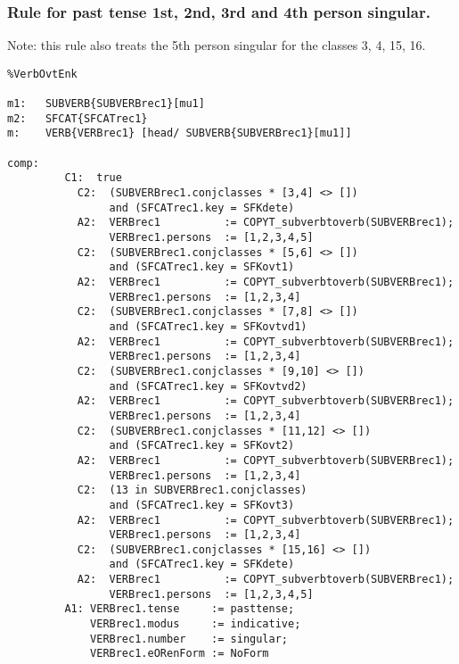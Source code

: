 \subsubsection{Rule for past tense 1st, 2nd, 3rd and 4th person singular.}

Note: this rule also treats the 5th
         person singular for the classes 3, 4, 15, 16.

\begin{verbatim}
%VerbOvtEnk

m1:   SUBVERB{SUBVERBrec1}[mu1]
m2:   SFCAT{SFCATrec1}
m:    VERB{VERBrec1} [head/ SUBVERB{SUBVERBrec1}[mu1]]

comp:
         C1:  true
           C2:  (SUBVERBrec1.conjclasses * [3,4] <> []) 
                and (SFCATrec1.key = SFKdete)
           A2:  VERBrec1          := COPYT_subverbtoverb(SUBVERBrec1);
                VERBrec1.persons  := [1,2,3,4,5]
           C2:  (SUBVERBrec1.conjclasses * [5,6] <> []) 
                and (SFCATrec1.key = SFKovt1)
           A2:  VERBrec1          := COPYT_subverbtoverb(SUBVERBrec1);
                VERBrec1.persons  := [1,2,3,4]
           C2:  (SUBVERBrec1.conjclasses * [7,8] <> [])
                and (SFCATrec1.key = SFKovtvd1)
           A2:  VERBrec1          := COPYT_subverbtoverb(SUBVERBrec1);
                VERBrec1.persons  := [1,2,3,4]
           C2:  (SUBVERBrec1.conjclasses * [9,10] <> [])
                and (SFCATrec1.key = SFKovtvd2)
           A2:  VERBrec1          := COPYT_subverbtoverb(SUBVERBrec1);
                VERBrec1.persons  := [1,2,3,4]
           C2:  (SUBVERBrec1.conjclasses * [11,12] <> []) 
                and (SFCATrec1.key = SFKovt2)
           A2:  VERBrec1          := COPYT_subverbtoverb(SUBVERBrec1);
                VERBrec1.persons  := [1,2,3,4]
           C2:  (13 in SUBVERBrec1.conjclasses) 
                and (SFCATrec1.key = SFKovt3)
           A2:  VERBrec1          := COPYT_subverbtoverb(SUBVERBrec1);
                VERBrec1.persons  := [1,2,3,4]
           C2:  (SUBVERBrec1.conjclasses * [15,16] <> []) 
                and (SFCATrec1.key = SFKdete)
           A2:  VERBrec1          := COPYT_subverbtoverb(SUBVERBrec1);
                VERBrec1.persons  := [1,2,3,4,5]
         A1: VERBrec1.tense     := pasttense;
             VERBrec1.modus     := indicative;
             VERBrec1.number    := singular;
             VERBrec1.eORenForm := NoForm


\end{verbatim}
